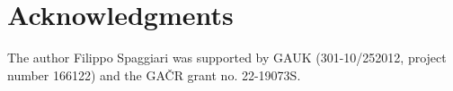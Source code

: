 \documentclass[a4paper, english, 9pt]{amsart}
\theoremstyle{plain}
\theoremstyle{definition}
\begin{document}
\section*{Acknowledgments}
\noindent The author Filippo Spaggiari was supported by GAUK (301-10/252012, project number 166122) and the GAČR grant no. 22-19073S.





\end{document}
